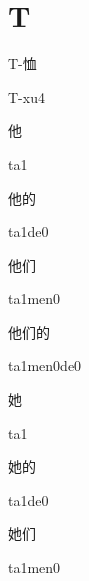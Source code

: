 ﻿%
\section*{T}

\begin{verbete}[T-xu4]{T-恤}
\begin{pronuncia}{T-xu4}
\end{pronuncia}
\end{verbete}

\begin{verbete}[ta1]{他}
\begin{pronuncia}{ta1}
\end{pronuncia}
\end{verbete}

\begin{verbete}[ta1de0]{他的}
\begin{pronuncia}{ta1de0}
\end{pronuncia}
\end{verbete}

\begin{verbete}[ta1men0]{他们}
\begin{pronuncia}{ta1men0}
\end{pronuncia}
\end{verbete}

\begin{verbete}[ta1men0de0]{他们的}
\begin{pronuncia}{ta1men0de0}
\end{pronuncia}
\end{verbete}

\begin{verbete}[ta1]{她}
\begin{pronuncia}{ta1}
\end{pronuncia}
\end{verbete}

\begin{verbete}[ta1de0]{她的}
\begin{pronuncia}{ta1de0}
\end{pronuncia}
\end{verbete}

\begin{verbete}[ta1men0]{她们}
\begin{pronuncia}{ta1men0}
\end{pronuncia}
\end{verbete}

